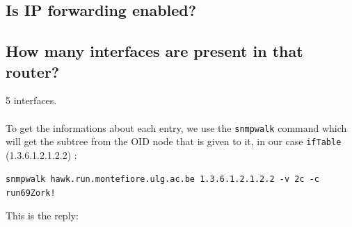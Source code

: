 \documentclass[a4paper,titlepage]{article}
\begin{document}
	\subsection{Is IP forwarding enabled?}

	\subsection{How many interfaces are present in that router?}
5 interfaces.
\paragraph{}
To get the informations about each entry, we use the \texttt{snmpwalk} command which will get the subtree from the OID node that is given to it, in our case \texttt{ifTable} (1.3.6.1.2.1.2.2) :
\begin{center}
	\texttt{snmpwalk hawk.run.montefiore.ulg.ac.be 1.3.6.1.2.1.2.2 -v 2c -c run69Zork!}
\end{center}
This is the reply: 
\end{document}
